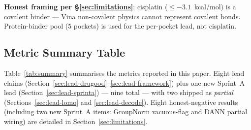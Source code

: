 \noindent\textbf{Honest framing per \S\ref{sec:limitations}}: cisplatin
($\leq -3.1$~kcal/mol) is a covalent binder --- Vina non-covalent physics
cannot represent covalent bonds.  Protein-binder pool ($5$ pockets) is
used for the per-pocket lead, not cisplatin.

\subsection{Metric Summary Table}
\label{sec:metric-summary}

Table~\ref{tab:summary} summarises the metrics reported in this paper.
Eight lead claims (Section~\ref{sec:lead-drugood}--\ref{sec:lead-framework})
plus one new Sprint~A lead (Section~\ref{sec:lead-sprinta}) --- nine total
--- with two shipped as \emph{partial} (Sections~\ref{sec:lead-lomo}
and \ref{sec:lead-decode}).  Eight honest-negative results
(including two new Sprint~A items: GroupNorm vacuous-flag and DANN
partial wiring) are detailed in Section~\ref{sec:limitations}.


